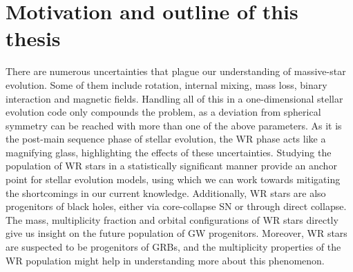 

\section{Motivation and outline of this thesis}\label{sect:motivation_intro}

There are numerous uncertainties that plague our understanding of massive-star evolution. Some of them include rotation, internal mixing, mass loss, binary interaction and magnetic fields. Handling all of this in a one-dimensional stellar evolution code only compounds the problem, as a deviation from spherical symmetry can be reached with more than one of the above parameters. As it is the post-main sequence phase of stellar evolution, the WR phase acts like a magnifying glass, highlighting the effects of these uncertainties. Studying the population of WR stars in a statistically significant manner provide an anchor point for stellar evolution models, using which we can work towards mitigating the shortcomings in our current knowledge. Additionally, WR stars are also progenitors of black holes, either via core-collapse SN or through direct collapse. The mass, multiplicity fraction and orbital configurations of WR stars directly give us insight on the future population of GW progenitors. Moreover, WR stars are suspected to be progenitors of GRBs, and the multiplicity properties of the WR population might help in understanding more about this phenomenon.


